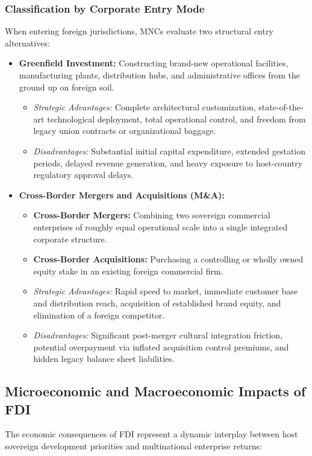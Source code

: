 \subsubsection{Classification by Corporate Entry Mode}
When entering foreign jurisdictions, MNCs evaluate two structural entry alternatives:
\begin{itemize}[leftmargin=1.5em]
    \item \textbf{Greenfield Investment:} Constructing brand-new operational facilities, manufacturing plants, distribution hubs, and administrative offices from the ground up on foreign soil.
    \begin{itemize}[leftmargin=1.5em]
        \item \textit{Strategic Advantages:} Complete architectural customization, state-of-the-art technological deployment, total operational control, and freedom from legacy union contracts or organizational baggage.
        \item \textit{Disadvantages:} Substantial initial capital expenditure, extended gestation periods, delayed revenue generation, and heavy exposure to host-country regulatory approval delays.
    \end{itemize}
    \item \textbf{Cross-Border Mergers and Acquisitions (M\&A):}
    \begin{itemize}[leftmargin=1.5em]
        \item \textbf{Cross-Border Mergers:} Combining two sovereign commercial enterprises of roughly equal operational scale into a single integrated corporate structure.
        \item \textbf{Cross-Border Acquisitions:} Purchasing a controlling or wholly owned equity stake in an existing foreign commercial firm.
        \item \textit{Strategic Advantages:} Rapid speed to market, immediate customer base and distribution reach, acquisition of established brand equity, and elimination of a foreign competitor.
        \item \textit{Disadvantages:} Significant post-merger cultural integration friction, potential overpayment via inflated acquisition control premiums, and hidden legacy balance sheet liabilities.
    \end{itemize}
\end{itemize}

\vspace{0.3em}

\subsection{Microeconomic and Macroeconomic Impacts of FDI}
The economic consequences of FDI represent a dynamic interplay between host sovereign development priorities and multinational enterprise returns:

